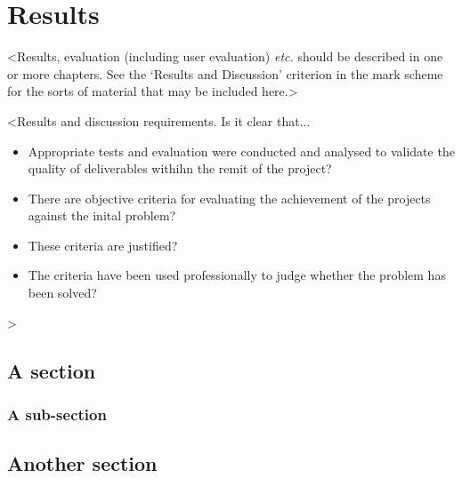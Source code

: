 \chapter{Results}
\label{chapter3}

<Results, evaluation (including user evaluation) {\em etc.} should be described in one or more chapters. See the `Results and Discussion' criterion in the mark scheme for the sorts of material that may be included here.>

<Results and discussion requirements. Is it clear that...
\begin{itemize}
    \item Appropriate tests and evaluation were conducted and analysed to validate the quality of deliverables withihn the remit of the project?
    \item There are objective criteria for evaluating the achievement of the projects against the inital problem?
    \item These criteria are justified?
    \item The criteria have been used professionally to judge whether the problem has been solved?
\end{itemize}
>

\section{A section}
\lipsum[8]

\subsection{A sub-section}
\lipsum[11]

\section{Another section}
\lipsum[12]
